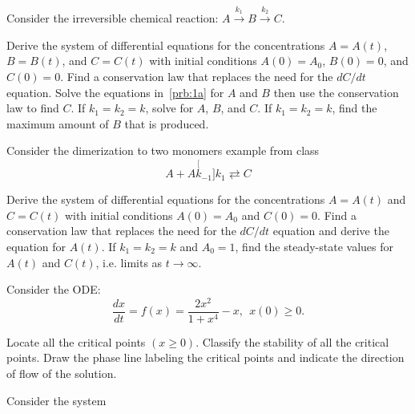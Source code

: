 \documentclass[
    number={7},
]{math486homework}
\begin{document}
\maketitle

\begin{problems}
    \problem Consider the irreversible chemical reaction: $A \stackrel{k_{1}}{\rightarrow} B \stackrel{k_{2}}{\rightarrow} C$.
    \begin{problems}
       \subproblem Derive the system of differential equations for the concentrations $A = A(t)$, $B = B(t)$, and $C = C(t)$ with initial conditions $A(0) = A_{0}$, $B(0) = 0$, and $C(0) = 0$. 
       \subproblem Find a conservation law that replaces the need for the $dC/dt$ equation. 
       \subproblem Solve the equations in~\ref{prb:1a} for $A$ and $B$ then use the conservation law to find $C$. 
       \subproblem If $k_{1} = k_{2} = k$, solve for $A$, $B$, and $C$. 
       \subproblem If $k_{1} = k_{2} = k$, find the maximum amount of $B$ that is produced. 
    \end{problems}
    \problem Consider the dimerization to two monomers example from class
    \[ A + A \stackrel[k_{-1}]{k_{1}}{\rightleftarrows} C \]
    \begin{problems}
       \subproblem Derive the system of differential equations for the concentrations $A = A(t)$ and $C = C(t)$ with initial conditions $A(0) = A_{0}$ and $C(0) = 0$. 
       \subproblem Find a conservation law that replaces the need for the $dC/dt$ equation and derive the equation for $A(t)$. 
       \subproblem If $k_{1} = k_{2} = k$ and $A_{0} = 1$, find the steady-state values for $A(t)$ and $C(t)$, i.e. limits as $t \rightarrow \infty$. 
    \end{problems}
    \subproblem Consider the ODE:
    \[ \frac{dx}{dt} = f(x) = \frac{2x^{2}}{1 + x^{4}} - x,\ \ x(0) \geq 0. \]
    \begin{problems}
       \subproblem Locate all the critical points $(x \geq 0)$. 
       \subproblem Classify the stability of all the critical points. 
       \subproblem Draw the phase line labeling the critical points and indicate the direction of flow of the solution. 
    \end{problems}
    \problem Consider the system
    \begin{equation*}

\end{equation*}
\end{problems}
\end{document}
